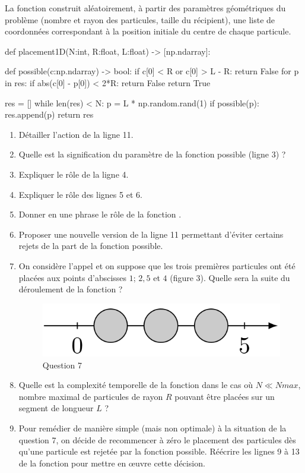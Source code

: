 \documentclass[twoside,french,11pt]{VcCours}
\begin{document}
La fonction  construit aléatoirement, à partir des paramètres géométriques du problème (nombre
et rayon des particules, taille du récipient), une liste de coordonnées correspondant à la position initiale du
centre de chaque particule.

\pagebreak
\begin{Python}
def placement1D(N:int, R:float, L:float) -> [np.ndarray]:

    def possible(c:np.ndarray) -> bool:
        if c[0] < R or c[0] > L - R: return False
        for p in res:
            if abs(c[0] - p[0]) < 2*R: return False
        return True

    res = []
    while len(res) < N:
        p = L * np.random.rand(1)
        if possible(p): res.append(p)
    return res
\end{Python}
\renewcommand{\labelenumi}{\textbf{Q \theenumi.}}
\begin{enumerate}
\item
Détailler l'action de la ligne 11.
\item
Quelle est la signification du paramètre  de la fonction possible (ligne 3) ?
\item
Expliquer le rôle de la ligne 4.
\item
Expliquer le rôle des lignes 5 et 6.
\item
Donner en une phrase le rôle de la fonction .
\item
Proposer une nouvelle version de la ligne 11 permettant d'éviter certains rejets de la part de la fonction
possible.
\item
On considère l'appel  et on suppose que les trois premières particules ont
été placées aux points d'abscisses $1$; $2,\!5$ et $4$ (figure 3). 
Quelle sera la suite du déroulement de la fonction  ?
\begin{figure}[h]
\centering
\includegraphics[scale=0.5]{DS1-figure3.png}
\caption{Question 7}
\end{figure}
\item
Quelle est la complexité temporelle de la fonction  dans le cas où $N\ll Nmax$, nombre
maximal de particules de rayon $R$ pouvant être placées sur un segment de longueur $L$ ?

\item
Pour remédier de manière simple (mais non optimale) à la situation de la question 7, on décide
de recommencer à zéro le placement des particules dès qu'une particule est rejetée par la fonction possible.
Réécrire les lignes 9 à 13 de la fonction  pour mettre en œuvre cette décision.
\end{enumerate}
\end{document}
